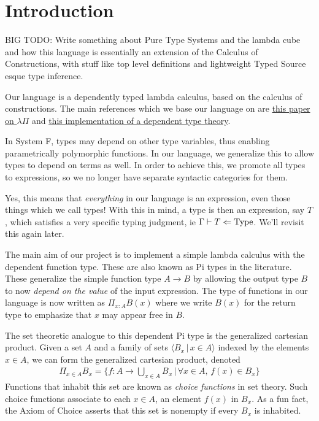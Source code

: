 \documentclass{article}
\begin{document}
\section{Introduction}

BIG TODO: Write something about Pure Type Systems and the lambda cube and how
this language is essentially an extension of the Calculus of Constructions, with
stuff like top level definitions and lightweight Typed Source esque type
inference.

Our language is a dependently typed lambda calculus, based on the calculus of
constructions.
The main references which we base our language on are
\href{https://www.andres-loeh.de/LambdaPi/LambdaPi.pdf}{this paper on $\lambda
  \Pi$} and \href{https://github.com/andrejbauer/spartan-type-theory}{this
  implementation of a dependent type theory}.

In System F, types may depend on other type variables, thus enabling
parametrically polymorphic functions. 
In our language, we generalize this to allow types to depend on terms as well.
In order to achieve this, we promote all types to expressions, so we no longer
have separate syntactic categories for them. 

Yes, this means that \textit{everything} in our language is an expression, even those
things which we call types!
With this in mind, a type is then an expression, say $T$, which satisfies a very
specific typing judgment, ie $\Gamma \vdash T \Leftarrow \operatorname{Type}$. We'll revisit
this again later.

The main aim of our project is to implement a simple lambda calculus with the
dependent function type. These are also known as Pi types in the literature.
These generalize the simple function type $A \to B$ by allowing the output type
$B$ to now \textit{depend on the value} of the input expression.
The type of functions in our language is now written as $\Pi_{x : A} B(x)$ where
we write $B(x)$ for the return type to emphasize that $x$ may appear free in
$B$.

The set theoretic analogue to this dependent Pi type is the generalized
cartesian product. Given a set $A$ and a family of sets $\langle B_x \, | \, x
\in A\rangle$ indexed by the
elements $x \in A$, we can form the generalized cartesian product, denoted
\begin{align*}
  \Pi_{x \in A} B_x = \bigg\{ f : A \rightarrow \bigcup_{x \in A} B_x \, | \, \forall x \in A, \, f(x) \in B_x \bigg\}
\end{align*}
Functions that inhabit this set are known as \textit{choice functions} in set
theory. Such choice functions associate to each $x \in A$, an element $f(x)$ in $B_x$.
As a fun fact, the Axiom of Choice asserts that this set is nonempty
if every $B_x$ is inhabited.
\end{document}

